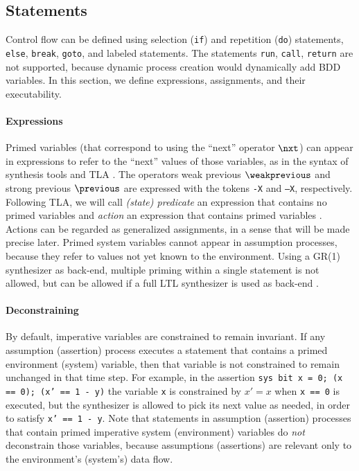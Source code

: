 \documentclass[copyright]{eptcs}
\begin{document}
\subsection{Statements}
\label{sec:guarded-statements}

Control flow can be defined using selection (\texttt{if}) and repetition (\texttt{do}) statements, \texttt{else}, \texttt{break}, \texttt{goto}, and labeled statements.
The statements \texttt{run}, \texttt{call}, \texttt{return} are not supported, because dynamic process creation would dynamically add BDD variables.
In this section, we define expressions, assignments, and their executability.


\paragraph{Expressions}
\label{sec:expressions}

Primed variables (that correspond to using the “next” operator $\nxt$)
can appear in expressions to refer to the “next” values of those variables, as in the syntax of synthesis tools and \textsc{TLA} \cite{Lamport94tpls}.
The operators weak previous $\weakprevious$ and strong previous $\previous$ are expressed with the tokens \texttt{-X} and \texttt{--X}, respectively.
Following \textsc{TLA}, we will call {\em (state) predicate} an expression that contains no primed variables and {\em action} an expression that contains primed variables \cite{Lamport94tpls}.
Actions can be regarded as generalized assignments, in a sense that will be made precise later.
Primed system variables cannot appear in assumption processes, because they refer to values not yet known to the environment.
Using a GR(1) synthesizer as back-end, multiple priming within a single statement is not allowed, but can be allowed if a full LTL synthesizer is used as back-end \cite{Jobstmann06fmcad,Finkbeiner13sttt}.


\paragraph{Deconstraining}

By default, imperative variables are constrained to remain invariant.
If any assumption (assertion) process executes a statement that contains a primed environment (system) variable, then that variable is not constrained to remain unchanged in that time step.
For example, in the assertion \texttt{sys bit x = 0; (x == 0); (x' == 1 - y)} the variable \texttt{x} is constrained by $x' = x$ when \texttt{x == 0} is executed, but the synthesizer is allowed to pick its next value as needed, in order to satisfy \texttt{x' == 1 - y}.
Note that statements in assumption (assertion) processes that contain primed imperative system (environment) variables do {\em not} deconstrain those variables, because assumptions (assertions) are relevant only to the environment's (system's) data flow.
\end{document}
